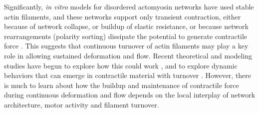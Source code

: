 Significantly, {\em in vitro} models for disordered actomyosin networks have used stable actin filaments, and these networks support only transient contraction, either because of network collapse\cite{Alvarado:2013aa}, or buildup of elastic resistance\cite{Murrell15062014}, or because network rearrangements (polarity sorting) dissipate the potential to generate contractile force \cite{Ndlec:1997aa,Surrey1167}. This suggests that continuous turnover of actin filaments may play a key role in allowing sustained deformation and flow. Recent theoretical and modeling studies have begun to explore how this could work \cite{2015arXiv150706182H,Mak:2016aa,10.1371/journal.pone.0000696}, and to explore dynamic behaviors that can emerge in contractile material with turnover \cite{PhysRevLett.113.148102}. However, there is much to learn about how the buildup and maintenance of contractile force during continuous deformation and flow depends on the local interplay of network architecture, motor activity and filament turnover.



